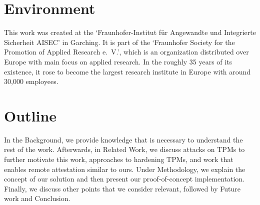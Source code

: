 \section{Environment}

This work was created at the `Fraunhofer-Institut für Angewandte und Integrierte Sicherheit AISEC' in Garching.
It is part of the `Fraunhofer Society for the Promotion of Applied Research e.~V.', which is an organization distributed over Europe with main focus on applied research.
In the roughly 35 years of its existence, it rose to become the largest research institute in Europe with around 30,000 employees.

\section{Outline}

In the Background, we provide knowledge that is necessary to understand the rest of the work.
Afterwards, in Related Work, we discuss attacks on TPMs to further motivate this work, approaches to hardening TPMs, and work that enables remote attestation similar to ours.
Under Methodology, we explain the concept of our solution and then present our proof-of-concept implementation.
Finally, we discuss other points that we consider relevant, followed by Future work and Conclusion.

